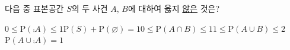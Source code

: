 다음 중 표본공간 $S$의 두 사건 $A$, $B$에 대하여 옳지 \underline{않은} 것은? 
\begin{choicesv}{$0\le\mathrm{P}(\comp{A})\le 1$}{$\mathrm{P}(S)+\mathrm{P}(\varnothing)=1$}{$0\le\mathrm{P}(A\cap B)\le 1$}{$1\le\mathrm{P}(A\cup B)\le 2$}{$\mathrm{P}(A\cup\comp{A})=1$}\end{choicesv}
